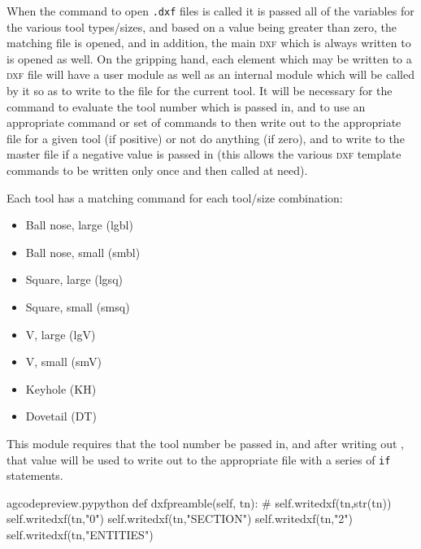\documentclass{ltxdoc}
\begin{document}
When the command to open \verb|.dxf| files is called it is passed all of the variables for the various tool types/sizes, and based on a value being greater than zero, the matching file is opened, and in addition, the main \textsc{dxf} which is always written to is opened as well. On the gripping hand, each element which may be written to a \textsc{dxf} file will have a user module as well as an internal module which will be called by it so as to write to the file for the current tool. It will be necessary for the  command to evaluate the tool number which is passed in, and to use an appropriate command or set of commands to then write out to the appropriate file for a given tool (if positive) or not do anything (if zero), and to write to the master file if a negative value is passed in (this allows the various \textsc{dxf} template commands to be written only once and then called at need).

Each tool has a matching command for each tool/size combination:

\begin{itemize}
\item Ball nose, large (lgbl) 
\item Ball nose, small (smbl) 
\item Square, large (lgsq) 
\item Square, small (smsq) 
\item V, large (lgV) 
\item V, small (smV) 
\item Keyhole (KH) 
\item Dovetail (DT) 
\end{itemize}
 

This module requires that the tool number be passed in, and after writing out , that value will be used to write out to the appropriate file with a series of \texttt{if} statements.
 
\lstset{firstnumber=\thegcpy}
\begin{writecode}{a}{gcodepreview.py}{python}
    def dxfpreamble(self, tn):
#        self.writedxf(tn,str(tn))
        self.writedxf(tn,"0")
        self.writedxf(tn,"SECTION")
        self.writedxf(tn,"2")
        self.writedxf(tn,"ENTITIES")

\end{writecode}
\addtocounter{gcpy}{7}
 
\end{document}
